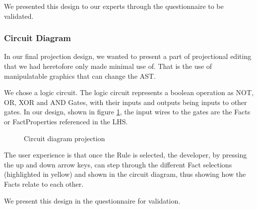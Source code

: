 We presented this design to our experts through the questionnaire to be validated.

\subsubsection{Circuit Diagram}
In our final projection design, we wanted to present a part of projectional editing that we had heretofore only made minimal use of.
That is the use of manipulatable graphics that can change the AST.

We chose a logic circuit. 
The logic circuit represents a boolean operation as NOT, OR, XOR and AND Gates, with their inputs and outputs being inputs to other gates.
In our design, shown in figure \ref{fig:CircuitDiagramProjection}, the input wires to the gates are the Facts or FactProperties referenced in the LHS.

\begin{figure}[h]
    \centering
    \caption{Circuit diagram projection}
    \label{fig:CircuitDiagramProjection}
\end{figure}

The user experience is that once the Rule is selected, the developer, by pressing the up and down arrow keys, can step through the different Fact selections (highlighted in yellow) and shown in the circuit diagram, thus showing how the Facts relate to each other.

We present this design in the questionnaire for validation.

